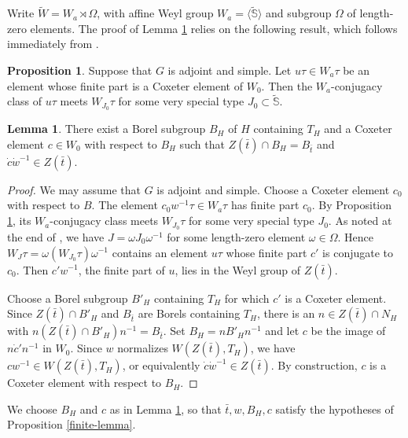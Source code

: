 \documentclass[12pt]{article}
\newcommand\tW{\tilde W}
\newcommand\tS{\tilde{\mathbb S}}
\theoremstyle{definition}
\newtheorem{prop}[theo]{Proposition}
\newtheorem{lemm}[theo]{Lemma}
\begin{document}
Write $\tW=W_a\rtimes\Omega$, with affine Weyl group $W_a=\langle\tS\rangle$ and subgroup $\Omega$ of length-zero elements.
The proof of Lemma \ref{parahoric-coxeter} relies on the following result, which follows immediately from \cite[Proposition 3.4.4]{HZZ25}.

\begin{prop}\label{finite-coxeter-part}
Suppose that $G$ is adjoint and simple. Let $u\tau\in W_a\tau$ be an element whose finite part is a Coxeter element of $W_0$. Then the $W_a$-conjugacy class of $u\tau$ meets $W_{J_0}\tau$ for some very special type $J_0\subset\tS$.
\end{prop}

\begin{lemm}\label{parahoric-coxeter}
There exist a Borel subgroup $B_H$ of $H$ containing $T_H$ and a Coxeter element $c\in W_0$ with respect to $B_H$ such that $Z(\bar t)\cap B_H=B_{\bar t}$ and $\dot c\dot w^{-1}\in Z(\bar t)$.
\end{lemm}

\begin{proof}
We may assume that $G$ is adjoint and simple. Choose a Coxeter element $c_0$ with respect to $B$. The element $c_0w^{-1}\tau\in W_a\tau$ has finite part $c_0$. By Proposition \ref{finite-coxeter-part}, its $W_a$-conjugacy class meets $W_{J_0}\tau$ for some very special type $J_0$.
As noted at the end of \cite[\S1.1]{HZZ25}, we have $J=\omega J_0\omega^{-1}$ for some length-zero element $\omega\in\Omega$. Hence $W_J\tau=\omega(W_{J_0}\tau)\omega^{-1}$ contains an element $u\tau$ whose finite part $c'$ is conjugate to $c_0$.
Then $c'w^{-1}$, the finite part of $u$, lies in the Weyl group of $Z(\bar t)$.

Choose a Borel subgroup $B'_H$ containing $T_H$ for which $c'$ is a Coxeter element. Since $Z(\bar t)\cap B'_H$ and $B_{\bar t}$ are Borels containing $T_H$, there is an $n\in Z(\bar t)\cap N_H$ with $n(Z(\bar t)\cap B'_H)n^{-1}=B_{\bar t}$. Set $B_H=nB'_Hn^{-1}$ and let $c$ be the image of $n\dot c'n^{-1}$ in $W_0$. Since $w$ normalizes $W(Z(\bar t),T_H)$, we have $cw^{-1}\in W(Z(\bar t),T_H)$, or equivalently $\dot c\dot w^{-1}\in Z(\bar t)$. By construction, $c$ is a Coxeter element with respect to $B_H$.
\end{proof}

We choose $B_H$ and $c$ as in Lemma \ref{parahoric-coxeter}, so that $\bar t,w,B_H,c$ satisfy the hypotheses of Proposition \ref{finite-lemma}.
\end{document}
